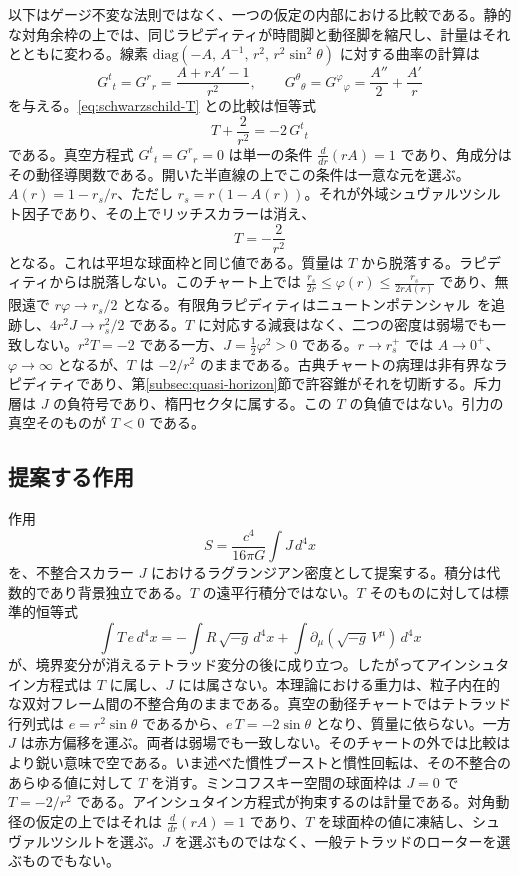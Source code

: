 \documentclass[a4paper]{article}
\begin{document}
以下はゲージ不変な法則ではなく、一つの仮定の内部における比較である。静的な対角余枠の上では、同じラピディティが時間脚と動径脚を縮尺し、計量はそれとともに変わる。線素 $\mathrm{diag}(-A,\,A^{-1},\,r^2,\,r^2\sin^2\theta)$ に対する曲率の計算は
\[
G^t{}_t=G^r{}_r=\frac{A+r A'-1}{r^2},\qquad
G^\theta{}_\theta=G^\varphi{}_\varphi=\frac{A''}{2}+\frac{A'}{r}
\]
を与える。\eqref{eq:schwarzschild-T} との比較は恒等式
\begin{equation}
\label{eq:jt-dictionary}
T+\frac{2}{r^2}=-2\,G^t{}_t
\end{equation}
である。真空方程式 $G^t{}_t=G^r{}_r=0$ は単一の条件 $\frac{d}{dr}(rA)=1$ であり、角成分はその動径導関数である。開いた半直線の上でこの条件は一意な元を選ぶ。$A(r)=1-r_s/r$、ただし $r_s=r(1-A(r))$。それが外域シュヴァルツシルト因子であり、その上でリッチスカラーは消え、
\[
T=-\frac{2}{r^2}
\]
となる。これは平坦な球面枠と同じ値である。質量は $T$ から脱落する。ラピディティからは脱落しない。このチャート上では $\frac{r_s}{2r}\le\varphi(r)\le\frac{r_s}{2rA(r)}$ であり、無限遠で $r\varphi\to r_s/2$ となる。有限角ラピディティはニュートンポテンシャル~\cite{newton1687}を追跡し、$4r^2 J\to r_s^2/2$ である。$T$ に対応する減衰はなく、二つの密度は弱場でも一致しない。$r^2 T=-2$ である一方、$J=\tfrac12\varphi^2>0$ である。$r\to r_s^+$ では $A\to 0^+$、$\varphi\to\infty$ となるが、$T$ は $-2/r^2$ のままである。古典チャートの病理は非有界なラピディティであり、第\ref{subsec:quasi-horizon}節で許容錐がそれを切断する。斥力層は $J$ の負符号であり、楕円セクタに属する。この $T$ の負値ではない。引力の真空そのものが $T<0$ である。

\subsection{提案する作用}

作用
\[
S = \frac{c^4}{16\pi G} \int J \, d^4x
\]
を、不整合スカラー $J$ におけるラグランジアン密度として提案する。積分は代数的であり背景独立である。$T$ の遠平行積分ではない。$T$ そのものに対しては標準的恒等式
\[
\int T \, e \, d^4x = -\int R \, \sqrt{-g} \, d^4x + \int \partial_\mu(\sqrt{-g}\, V^\mu)\, d^4x
\]
が、境界変分が消えるテトラッド変分の後に成り立つ。したがってアインシュタイン方程式は $T$ に属し、$J$ には属さない。本理論における重力は、粒子内在的な双対フレーム間の不整合角のままである。真空の動径チャートではテトラッド行列式は $e=r^2\sin\theta$ であるから、$e\,T=-2\sin\theta$ となり、質量に依らない。一方 $J$ は赤方偏移を運ぶ。両者は弱場でも一致しない。そのチャートの外では比較はより鋭い意味で空である。いま述べた慣性ブーストと慣性回転は、その不整合のあらゆる値に対して $T$ を消す。ミンコフスキー空間の球面枠は $J=0$ で $T=-2/r^2$ である。アインシュタイン方程式が拘束するのは計量である。対角動径の仮定の上ではそれは $\frac{d}{dr}(rA)=1$ であり、$T$ を球面枠の値に凍結し、シュヴァルツシルトを選ぶ。$J$ を選ぶものではなく、一般テトラッドのローターを選ぶものでもない。
\end{document}
